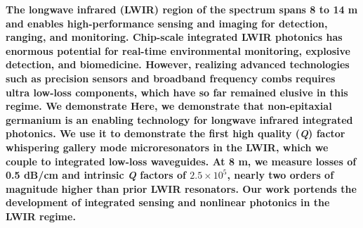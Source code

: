 \documentclass[fleqn,10pt,twocolumn]{wlscirep}
\begin{document}
\newcommand\dfbtuning{%
A DFB QCL with peak power of 250 mW and wavelength tuning range from 1285.5 to 1290.5 $\si{\cm^{-1}}$ has been used to perform the wavelength-dependent transmission measurements. A linear parameter space of current and temperature was established in order to wavelength-tune at a constant power of 10 mW. An Arroyo 6310-QCL controller was used to control the temperature of the TEC and current of the QCL laser with a minimum step size of 0.01 $\si{\celsius}$ and 0.02 $\si{\mA}$.}


\textbf{The longwave infrared (LWIR) region of the spectrum spans 8 to 14 \micro m and enables high-performance sensing and imaging for detection, ranging, and monitoring. Chip-scale integrated LWIR photonics has enormous potential for real-time environmental monitoring, explosive detection, and biomedicine. However, realizing advanced technologies such as precision sensors and broadband frequency combs requires ultra low-loss components, which have so far remained elusive in this regime. 
\ifpreprint
We demonstrate
\else
Here, we demonstrate
\fi that non-epitaxial germanium is an enabling technology for longwave infrared integrated photonics. We use it to demonstrate the first high quality (\emph{Q}) factor whispering gallery mode microresonators in the LWIR, which we couple to integrated low-loss waveguides. At 8 \micro m, we measure losses of 0.5 dB/cm and intrinsic \emph{Q} factors of $2.5 \times 10^{5}$, nearly two orders of magnitude higher than prior LWIR resonators. Our work portends the development of integrated sensing and nonlinear photonics in the LWIR regime.}

\end{document}
